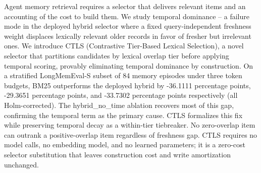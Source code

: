 Agent memory retrieval requires a selector that delivers relevant items and an accounting of the cost to build them. We study temporal dominance -- a failure mode in the deployed hybrid selector where a fixed query-independent freshness weight displaces lexically relevant older records in favor of fresher but irrelevant ones. We introduce CTLS (Contrastive Tier-Based Lexical Selection), a novel selector that partitions candidates by lexical overlap tier before applying temporal scoring, provably eliminating temporal dominance by construction. On a stratified LongMemEval-S subset of 84 memory episodes under three token budgets, BM25 outperforms the deployed hybrid by -36.1111 percentage points, -29.3651 percentage points, and -33.7302 percentage points respectively (all Holm-corrected). The hybrid\_no\_time ablation recovers most of this gap, confirming the temporal term as the primary cause. CTLS formalizes this fix while preserving temporal decay as a within-tier tiebreaker. No zero-overlap item can outrank a positive-overlap item regardless of freshness gap. CTLS requires no model calls, no embedding model, and no learned parameters; it is a zero-cost selector substitution that leaves construction cost and write amortization unchanged.
